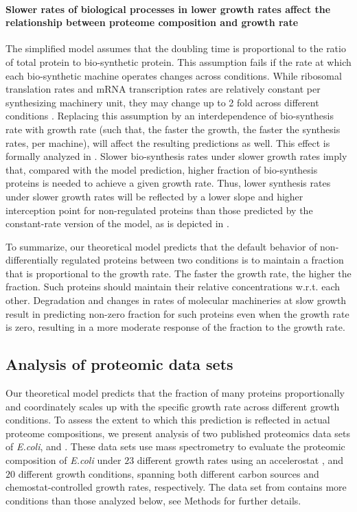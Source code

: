 \documentclass[10pt,letterpaper]{article}
\newcommand{\hConds}{$20$}
\newcommand{\vnCondsnum}{23}
\newcommand{\vnConds}{$\vnCondsnum$}
\newcommand{\vConds}{\vnConds{}}
\begin{document}
\paragraph{Slower rates of biological processes in lower growth rates affect the relationship between proteome composition and growth rate}

The simplified model assumes that the doubling time is proportional to the ratio of total protein to bio-synthetic protein.
This assumption fails if the rate at which each bio-synthetic machine operates changes across conditions.
While ribosomal translation rates and mRNA transcription rates are relatively constant per synthesizing machinery unit, they may change up to 2 fold across different conditions \cite{Bremer1987}.
Replacing this assumption by an interdependence of bio-synthesis rate with growth rate (such that, the faster the growth, the faster the synthesis rates, per machine)\cite{Bremer1987,Valgepea2013}, will affect the resulting predictions as well.
This effect is formally analyzed in .
Slower bio-synthesis rates under slower growth rates imply that, compared with the model prediction, higher fraction of bio-synthesis proteins is needed to achieve a given growth rate.
Thus, lower synthesis rates under slower growth rates will be reflected by a lower slope and higher interception point for non-regulated proteins than those predicted by the constant-rate version of the model, as is depicted in .

To summarize, our theoretical model predicts that the default behavior of non-differentially regulated proteins between two conditions is to maintain a fraction that is proportional to the growth rate.
The faster the growth rate, the higher the fraction.
Such proteins should maintain their relative concentrations w.r.t. each other.
Degradation and changes in rates of molecular machineries at slow growth result in predicting non-zero fraction for such proteins even when the growth rate is zero, resulting in a more moderate response of the fraction to the growth rate.

\subsection*{Analysis of proteomic data sets}
Our theoretical model predicts that the fraction of many proteins proportionally and coordinately scales up with the specific growth rate across different growth conditions.
To assess the extent to which this prediction is reflected in actual proteome compositions, we present analysis of two published proteomics data sets of \emph{E.coli}, \cite{Peebo_2015} and \cite{Schmidt2015}.
These data sets use mass spectrometry to evaluate the proteomic composition of \emph{E.coli} under \vConds{} different growth rates using an accelerostat \cite{Paalme_1995}, and \hConds{} different growth conditions, spanning both different carbon sources and chemostat-controlled growth rates, respectively.
The data set from \cite{Schmidt2015} contains more conditions than those analyzed below, see Methods for further details.
\end{document}
